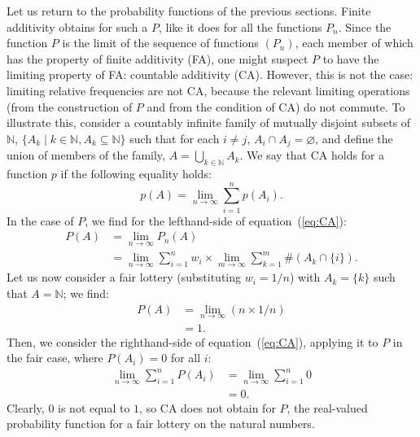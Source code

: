 Let us return to the probability functions of the previous sections. Finite additivity obtains for such a $P$, like it does for all the functions $P_n$. Since the function $P$ is the limit of the sequence of functions $\left( P_n \right)$, each member of which has the property of finite additivity (FA), one might suspect $P$ to have the limiting property of FA: countable additivity (CA). However, this is not the case: limiting relative frequencies are not CA, because the relevant limiting operations (from the construction of $P$ and from the condition of CA) do not commute. To illustrate this, consider a countably infinite family of mutually disjoint subsets of $\mathbb{N}$, $\{ A_k \mid k \in \mathbb{N}, A_k \subseteq \mathbb{N} \}$ such that for each $i \neq j$, $A_i \cap A_j = \varnothing$, and define the union of members of the family, $A = \bigcup_{k \in \mathbb{N}} A_k$. We say that CA holds for a function $p$ if the following equality holds:
\begin{equation}\label{eq:CA}
p(A) = \lim_{n \rightarrow \infty} \sum_{i=1}^{n} p(A_i).
\end{equation}
In the case of $P$, we find for the lefthand-side of equation~(\ref{eq:CA}):
$$
\begin{aligned}
P(A) &= \lim_{n \rightarrow \infty} P_n(A)\\
     &= \lim_{n \rightarrow \infty} \sum_{i=1}^{n}w_i \times\lim_{m \rightarrow \infty}\sum_{k =1}^m \#(A_k \cap \{i\}).
\end{aligned}
$$
Let us now consider a fair lottery (substituting $w_i=1/n$) with $A_k=\{k\}$ such that $A=\mathbb{N}$; we find:
$$
\begin{aligned}
P(A) &=\lim_{n \rightarrow \infty} (n \times 1/n)\\
     &= 1.
\end{aligned}
$$
Then, we consider the righthand-side of equation~(\ref{eq:CA}), applying it to $P$ in the fair case, where $P(A_i)=0$ for all $i$:
$$
\begin{aligned}
\lim_{n \rightarrow \infty} \sum_{i=1}^{n} P(A_i) &= \lim_{n \rightarrow \infty} \sum_{i=1}^{n} 0\\
  &= 0.
\end{aligned}
$$
Clearly, $0$ is not equal to $1$, so CA does not obtain for $P$, the real-valued probability function for a fair lottery on the natural numbers.

